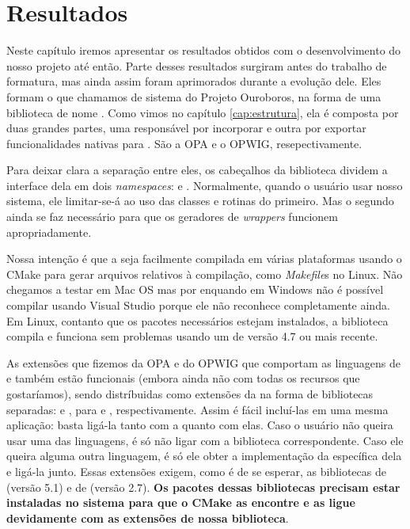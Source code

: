 \chapter{Resultados}
\label{cap:resultados}

Neste capítulo iremos apresentar os resultados obtidos com o
desenvolvimento do nosso projeto até então. Parte desses resultados
surgiram antes do trabalho de formatura, mas ainda assim foram aprimorados
durante a evolução dele. Eles formam o que chamamos de sistema do
Projeto Ouroboros, na forma de uma biblioteca \CXX{} de nome
. Como vimos no capítulo \ref{cap:estrutura},
ela é composta por duas grandes partes, uma responsável por incorporar
 e outra por exportar funcionalidades nativas para .
São a OPA e o OPWIG, resepectivamente.

Para deixar clara a separação entre eles, os cabeçalhos da biblioteca
dividem a interface dela em dois \textit{namespaces}:  e .
Normalmente, quando o usuário usar nosso sistema, ele limitar-se-á ao uso
das classes e rotinas do primeiro. Mas o segundo ainda se faz necessário
para que os geradores de \textit{wrappers} funcionem apropriadamente.

Nossa intenção é que a  seja facilmente compilada em várias plataformas
usando o CMake para gerar arquivos relativos à compilação, como \textit{Makefile}s
no Linux. Não chegamos a testar em Mac OS mas por enquando em Windows não é
possível compilar usando Visual Studio porque ele não reconhece  completamente
ainda. Em Linux, contanto que os pacotes necessários estejam instalados, a biblioteca
compila e funciona sem problemas usando um  de versão 4.7 ou mais recente.

As extensões que fizemos da OPA e do OPWIG que comportam as linguagens de
\script{}  e  também estão funcionais (embora ainda não
com todas os recursos que gostaríamos), sendo distríbuidas como extensões
da  na forma de bibliotecas separadas: 
e , para  e , respectivamente.
Assim é fácil incluí-las em uma mesma aplicação: basta ligá-la tanto com a
 quanto com elas. Caso o usuário não queira usar uma das linguagens,
é só não ligar com a biblioteca correspondente. Caso ele queira alguma outra
linguagem, é só ele obter a implementação da  específica dela
e ligá-la junto.
Essas extensões exigem, como é de se esperar, as bibliotecas de  (versão 5.1)
e de  (versão 2.7). \textbf{Os pacotes dessas bibliotecas precisam estar
instaladas no sistema para que o CMake as encontre e as ligue devidamente com as
extensões de nossa biblioteca}.

